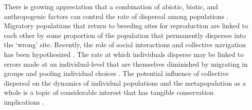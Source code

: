 \documentclass{revtex4}
\begin{document}
There is growing appreciation that a combination of abiotic, biotic, and anthropogenic factors can control the rate of dispersal among populations \citep{H:2013fs,Keefer:2014gg,Bett:2017ha}.
Migratory populations that return to breeding sites for reproduction are linked to each other by some proportion of the population that permanently disperses into the `wrong' site. 
Recently, the role of social interactions and collective navigation has been hypothesized \citep[][this volume]{Berdahl:2015kv,Berdahl:2016dx,HardestyMoore:wg}.
The rate at which individuals disperse may be linked to errors made at an individual-level that are themselves diminished by migrating in groups and pooling individual choices \citep{Simons:2004jo,Berdahl:2015kv,Berdahl:2016dx}.
The potential influence of collective dispersal on the dynamics of individual populations and the metapopulation as a whole is a topic of considerable interest that has tangible conservation implications \citep{Brenner:2012gl,Johnson:2012fe,Fullerton:2011ii}.



\end{document}
